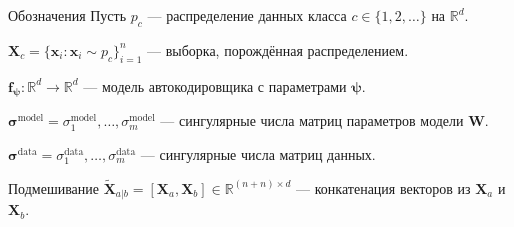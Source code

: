 \documentclass{beamer}
\begin{document}

\begin{frame}{Обозначения}
Пусть $p_c$ --- распределение данных класса $c\in\{1,2,\ldots\}$ на $\mathbb{R}^d$.

$\mathbf{X}_c = \{\mathbf{x}_i : \mathbf{x}_i \sim p_c\}_{i=1}^{n}$ --- выборка, порождённая распределением.

\bigskip

$\mathbf{f}_{\boldsymbol{\psi}}: \mathbb{R}^d \to \mathbb{R}^d$ --- модель автокодировщика с параметрами $\boldsymbol{\psi}$.

\bigskip

$\boldsymbol{\sigma}^{\text{model}} = \sigma_1^{\text{model}}, \dots, \sigma_m^{\text{model}}$ --- сингулярные числа матриц параметров модели $\mathbf{W}$.

$\boldsymbol{\sigma}^{\text{data}} = \sigma_1^{\text{data}}, \dots, \sigma_m^{\text{data}}$ --- сингулярные числа матриц данных.

\bigskip

Подмешивание $\tilde{\mathbf{X}}_{a|b} = [\mathbf{X}_a, \mathbf{X}_b] \in \mathbb{R}^{(n + n) \times d}$ --- конкатенация векторов из $\mathbf{X}_a$ и $\mathbf{X}_b$.
\end{frame}

\end{document}
